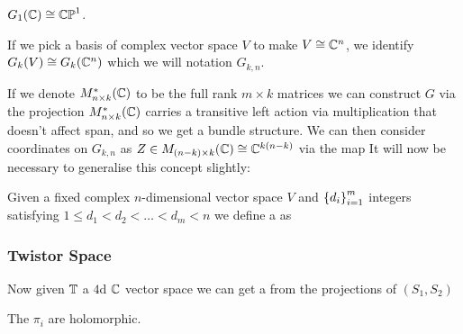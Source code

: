 \documentclass{article}
\begin{document}
\begin{example} 
	$G_1(\mathbb{C}) \cong \mathbb{CP}^1$. 
\end{example}

\begin{notation}
	If we pick a basis of complex vector space $V$ to make $V \cong \mathbb{C}^n$, we identify $G_k(V) \cong G_k(\mathbb{C}^n)$ which we will notation $G_{k,n}$. 
\end{notation}

If we denote $M^\ast_{n \times k}(\mathbb{C})$ to be the full rank $m \times k$ matrices we can construct $G$ via the projection 
$M^\ast_{n \times k}(\mathbb{C})$ carries a transitive left action via multiplication that doesn't affect span, and so we get a bundle structure. We can then consider coordinates on $G_{k,n}$ as $Z \in M_{(n-k) \times k}(\mathbb{C})\cong \mathbb{C}^{k(n-k)}$ via the map 
It will now be necessary to generalise this concept slightly:
\begin{definition}
	Given a fixed complex $n$-dimensional vector space $V$ and $\left\{ d_i \right\}_{i=1}^m$ integers satisfying $1 \leq d_1 < d_2 < \dots < d_m < n$ we define a  as 
\end{definition}

\subsubsection{Twistor Space}
Now given $\mathbb{T}$ a $4$d $\mathbb{C}$ vector space we can get a 
from the projections of $(S_1,S_2)$ 
\begin{prop}
	The $\pi_i$ are holomorphic.
\end{prop}
\end{document}
